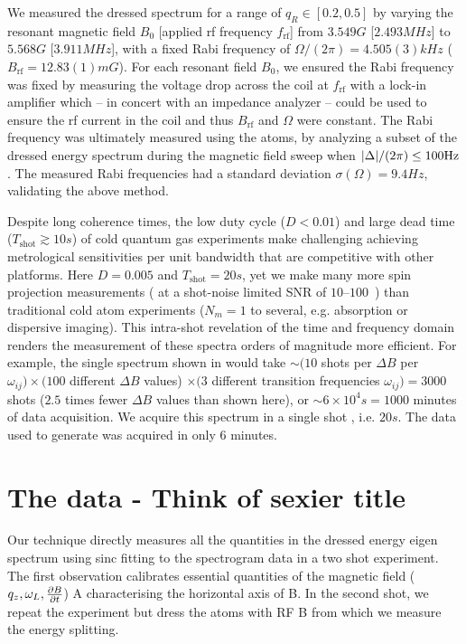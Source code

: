 \documentclass[aps,prl,reprint,superscriptaddress,floatfix]{revtex4-1}
\begin{document}
We measured the dressed spectrum for a range of $q_R \in [0.2, 0.5]$ by varying the resonant magnetic field $B_0$ [applied rf frequency $f_{\text{rf}}$] from $3.549\unit{G}$ [$2.493\unit{MHz}$] to $5.568\unit{G}$ [$3.911\unit{MHz}$], with a fixed Rabi frequency of $\Omega/(2\pi) = 4.505(3)\unit{kHz}$ ($B_{\text{rf}} = 12.83(1)\unit{mG}$).
For each resonant field $B_0$, we ensured the Rabi frequency was fixed by measuring the voltage drop across the coil at $f_{\text{rf}}$ with a lock-in amplifier which -- in concert with an impedance analyzer -- could be used to ensure the rf current in the coil and thus $B_{\text{rf}}$ and $\Omega$ were constant. 
The Rabi frequency was ultimately measured using the atoms, by analyzing a subset of the dressed energy spectrum during the magnetic field sweep when $\abs{\Delta}/(2\pi) \leq 100\unit{Hz}$.
The measured Rabi frequencies had a standard deviation $\sigma(\Omega) = 9.4\unit{Hz}$, validating the above method.

Despite long coherence times, the low duty cycle ($D < 0.01$) and large dead time ($T_\text{shot} \gtrsim 10\unit{s}$) of cold quantum gas experiments make challenging achieving metrological sensitivities per unit bandwidth that are competitive with other platforms.
Here $D=0.005$ and $T_\text{shot} = 20\unit{s}$, yet we make many more spin projection measurements ( at a shot-noise limited SNR of $10$--$100$~\cite{jasperse_magic-wavelength_2017}) than traditional cold atom experiments ($N_m = 1$ to several, e.g. absorption or dispersive imaging).
This intra-shot revelation of the time and frequency domain renders the measurement of these spectra orders of magnitude more efficient.
For example, the single spectrum shown in  would take $\sim (10$ shots per $\Delta B$ per $\omega_{ij} ) \times (100$ different $\Delta B$ values) $\times (3 $ different transition frequencies $\omega_{ij}) = 3000$ shots ($2.5$ times fewer $\Delta B$ values than shown here), or $\sim 6\times10^4\unit{s} = 1000$ minutes of data acquisition.
We acquire this spectrum in a single shot , i.e. $20\unit{s}$.
The data used to generate  was acquired in only $6$ minutes.
  

\section{The data - Think of sexier title}
\label{sec:data}
Our technique directly measures all the quantities in the dressed energy eigen spectrum using sinc fitting to the spectrogram data in a two shot experiment. 
The first observation calibrates essential quantities of the magnetic field ($q_{z}, \omega_{L}, \frac{\partial B}{\partial t} $) A characterising the horizontal axis of B. In the second shot, we repeat the experiment but dress the atoms with RF B from which we measure the energy splitting. 



   
\end{document}
